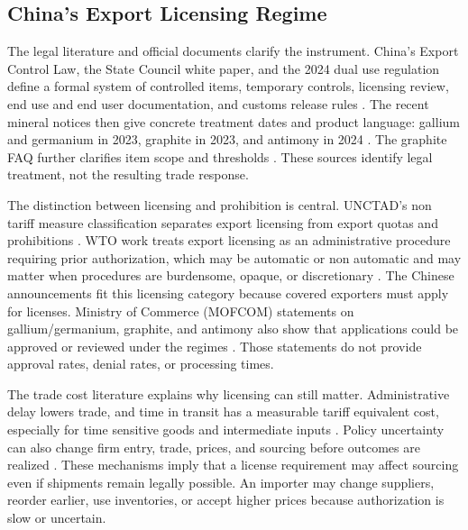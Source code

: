 \documentclass[12pt,a4paper]{article}
\numberwithin{equation}{section}
\begin{document}
\subsection{China's Export Licensing Regime}

The legal literature and official documents clarify the instrument. China's Export Control Law, the State Council white paper, and the 2024 dual use regulation define a formal system of controlled items, temporary controls, licensing review, end use and end user documentation, and customs release rules \citep{prc_2020_export_control_law,scio_2021_chinas_export_controls,prc2024_dual_use_regulations}. The recent mineral notices then give concrete treatment dates and product language: gallium and germanium in 2023, graphite in 2023, and antimony in 2024 \citep{mofcom_2023_gallium_germanium_controls,mofcom_2023_graphite_controls,mofcom_2024_antimony_controls}. The graphite FAQ further clarifies item scope and thresholds \citep{mofcom_2024_graphite_faq}. These sources identify legal treatment, not the resulting trade response.

The distinction between licensing and prohibition is central. UNCTAD's non tariff measure classification separates export licensing from export quotas and prohibitions \citep{unctad2019ntm_classification}. WTO work treats export licensing as an administrative procedure requiring prior authorization, which may be automatic or non automatic and may matter when procedures are burdensome, opaque, or discretionary \citep{gamberale_tarasenko2023_export_licensing}. The Chinese announcements fit this licensing category because covered exporters must apply for licenses. Ministry of Commerce (MOFCOM) statements on gallium/germanium, graphite, and antimony also show that applications could be approved or reviewed under the regimes \citep{mofcom_2023_gallium_germanium_approvals,mofcom_2024_graphite_approvals,mofcom_2024_antimony_license_review}. Those statements do not provide approval rates, denial rates, or processing times.

The trade cost literature explains why licensing can still matter. Administrative delay lowers trade, and time in transit has a measurable tariff equivalent cost, especially for time sensitive goods and intermediate inputs \citep{djankov_freund_pham2010_trading_on_time,hummels_schaur2013_time_trade_barrier}. Policy uncertainty can also change firm entry, trade, prices, and sourcing before outcomes are realized \citep{handley_limao2017_policy_uncertainty}. These mechanisms imply that a license requirement may affect sourcing even if shipments remain legally possible. An importer may change suppliers, reorder earlier, use inventories, or accept higher prices because authorization is slow or uncertain.
\end{document}
